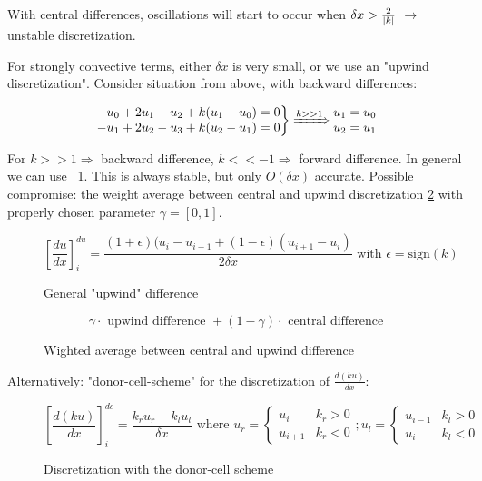 With central differences, oscillations will start to occur when $\delta x > \frac{2}{\lvert k\rvert}$ $\rightarrow$ unstable discretization.

For strongly convective terms, either $\delta x$ is very small, or we use an "upwind discretization". Consider situation from above, with backward differences:

\[\left.\begin{matrix}
	-u_0 + 2u_1 -u_2  + k(u_1 -u_0) =0\\
	-u_1 + 2u_2 - u_3 + k(u_2-u_1) = 0
	\end{matrix}\right\rbrace \xRightarrow{k >> 1}\begin{matrix}
	u_1 = u_0\\
	u_2 = u_1
	\end{matrix} \]

For $k >> 1 \Rightarrow$ backward difference, $k << -1 \Rightarrow$ forward difference.
In general we can use ~\ref{fig:disc-upwind}. This is always stable, but only $O(\delta x)$ accurate. Possible compromise: the weight average between central and upwind discretization \ref{fig:weighted-average} with properly chosen parameter $\gamma = [0,1]$.
\begin{figure}[H]
	\centering
	\[ \left[\frac{d u}{d x}\right]^{du}_i = \frac{ (1+\epsilon) (u_i - u_{i-1} + (1 - \epsilon) (u_{i+1} - u_i)}{ 2 \delta x} \text{ with } \epsilon = \text{sign}(k) \]
	\renewcommand{\thefigure}{3.9}
	\caption{General "upwind" difference}
	\label{fig:disc-upwind}
\end{figure}

\begin{figure}[H]
	\centering
	\[ \gamma \cdot \text{ upwind difference } + (1-\gamma) \cdot \text{ central difference} \]
	\renewcommand{\thefigure}{3.10}
	\caption{Wighted average between central and upwind difference}
	\label{fig:weighted-average}
\end{figure}

Alternatively: "donor-cell-scheme" for the discretization of $\frac{d(ku)}{dx}$:
\begin{figure}[h]
	\centering
	\[ \left[\frac{d(k u)}{d x}\right]^{dc}_i = \frac{ k_r u_r - k_l u_l}{ \delta x} \text{ where } u_r = \begin{cases}
	u_i & k_r > 0\\
	u_{i+1} & k_r < 0
\end{cases} ; u_l = \begin{cases}
u_{i-1} & k_l > 0\\
u_{i} & k_l < 0
\end{cases} \]
	\renewcommand{\thefigure}{3.11}
	\caption{Discretization with the donor-cell scheme}
	\label{fig:dcs-method}
\end{figure}


